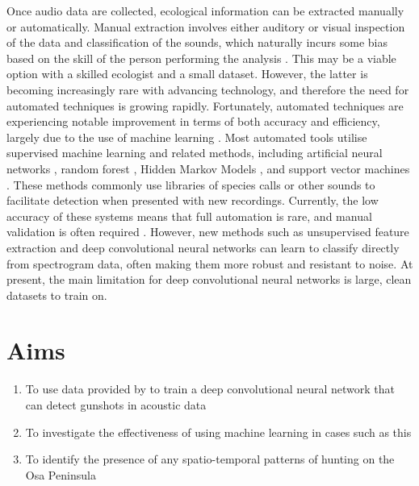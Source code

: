 Once audio data are collected, ecological information can be extracted manually or automatically. Manual extraction involves either auditory or visual inspection of the data and classification of the sounds, which naturally incurs some bias based on the skill of the person performing the analysis \citep{Heinicke2015}. This may be a viable option with a skilled ecologist and a small dataset. However, the latter is becoming increasingly rare with advancing technology, and therefore the need for automated techniques is growing rapidly. Fortunately, automated techniques are experiencing notable improvement in terms of both accuracy and efficiency, largely due to the use of machine learning \citep{Digby2013}. Most automated tools utilise supervised machine learning and related methods, including artificial neural networks \citep{Walters2012}, random forest \citep{ZamoraGutierrez2016}, Hidden Markov Models \citep{Zilli2014}, and support vector machines \citep{Heinicke2015}. These methods commonly use libraries of species calls or other sounds to facilitate detection when presented with new recordings. Currently, the low accuracy of these systems means that full automation is rare, and manual validation is often required \citep{Kalan2016}. However, new methods such as unsupervised feature extraction \citep{Stowell2014} and deep convolutional neural networks \citep{Goeau2016} can learn to classify directly from spectrogram data, often making them more robust and resistant to noise. At present, the main limitation for deep convolutional neural networks is large, clean datasets to train on.



\section{Aims}

\begin{enumerate}
  \item To use data provided by \cite{Hill2018} to train a deep convolutional neural network that can detect gunshots in acoustic data
  \item To investigate the effectiveness of using machine learning in cases such as this
  \item To identify the presence of any spatio-temporal patterns of hunting on the Osa Peninsula
\end{enumerate}

